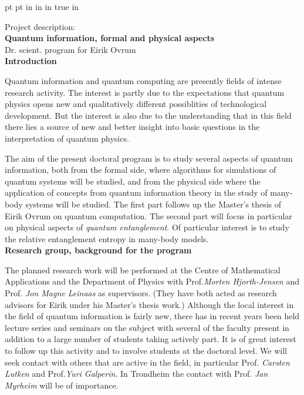 
\baselineskip
{} pt
 pt
 in
 in
 in
 true in
\raggedbottom

\newcommand{\pref}[1]{(\ref{#1})}



\noindent
Project description:\\

\noindent
{\Large{\bf Quantum information, formal and physical aspects}}\\
{Dr. scient. program for Eirik Ovrum}\\



\noindent
{\large{\bf Introduction}}


\noindent
Quantum information and quantum computing are presently fields of intense
research activity. The interest is partly due to the expectations
that quantum physics opens new and qualitatively different
possiblities of technological development. But the interest
is also due to the understanding that in this field there lies a source of new
and better insight into basic questions in the interpretation of quantum
physics.

The aim of the present doctoral program is to study several aspects of quantum
information, both from the  formal side,
where algorithms for simulations of quantum
systems will be studied, and from the physical side where the application of
concepts from quantum information theory in the study of many-body systems
will be studied. The first part follows up the Master's thesis of Eirik
Ovrum on quantum computation. The second part will focus in particular on
physical aspects of {\em quantum entanglement}. Of particular interest is
to study the relative entanglement entropy in  many-body models.
\\

\noindent
{\large{\bf Research group, background for the program}}

\noindent
The planned research work will be performed at the Centre of
Mathematical Applications and the Department
of Physics with Prof.{\em Morten Hjorth-Jensen} and Prof. {\em Jon
Magne Leinaas} 
as supervisors. (They have both acted
as research
advisors for Eirik under his Master's thesis work.) Although the local
interest in the field of quantum information is fairly new, there has in recent
years been held lecture series and seminars on the subject with several  of the
faculty present in addition to a large number of students taking actively
part. It is of
great interest to follow up this activity and to involve students at
the doctoral
level. We will seek contact with others that are active in the
field, in particular Prof. {\em Carsten Lutken} and Prof.{\em Yuri
Galperin}. In
Trondheim the contact with Prof. {\em Jan Myrheim} will be of importance.\\

